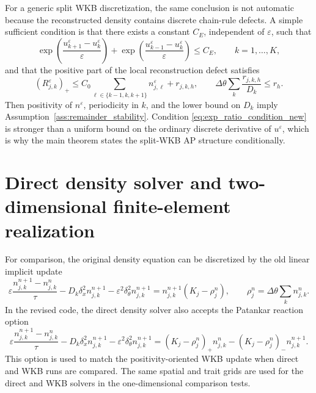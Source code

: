 \documentclass[11pt]{article}
\begin{document}
For a generic split WKB discretization, the same conclusion is not automatic because the reconstructed density contains discrete chain-rule defects.  A simple sufficient condition is that there exists a constant \(C_E\), independent of \(\varepsilon\), such that
\begin{equation}\label{eq:exp_ratio_condition_new}
    \exp\left(\frac{u_{k+1}^{\varepsilon}-u_k^{\varepsilon}}{\varepsilon}\right)
    +
    \exp\left(\frac{u_{k-1}^{\varepsilon}-u_k^{\varepsilon}}{\varepsilon}\right)
    \le C_E,
    \qquad k=1,\ldots,K,
\end{equation}
and that the positive part of the local reconstruction defect satisfies
\begin{equation}\label{eq:local_defect_condition_new}
    (R_{j,k}^{\varepsilon})_+
    \le C_0\sum_{\ell\in\{k-1,k,k+1\}}n_{j,\ell}^{\varepsilon}+r_{j,k,h},
    \qquad
    \Delta\theta\sum_k\frac{r_{j,k,h}}{D_k}\le r_h.
\end{equation}
Then positivity of \(n^\varepsilon\), periodicity in \(k\), and the lower bound on \(D_k\) imply Assumption~\ref{ass:remainder_stability}.  Condition \eqref{eq:exp_ratio_condition_new} is stronger than a uniform bound on the ordinary discrete derivative of \(u^\varepsilon\), which is why the main theorem states the split-WKB AP structure conditionally.

\section{Direct density solver and two-dimensional finite-element realization}\label{app:direct_2d}

For comparison, the original density equation can be discretized by the old linear implicit update
\begin{equation}\label{eq:direct_density_fully_new}
    \varepsilon\frac{n_{j,k}^{n+1}-n_{j,k}^n}{\tau}
    -D_k\delta_x^2n_{j,k}^{n+1}
    -\varepsilon^2\delta_\theta^2n_{j,k}^{n+1}
    =n_{j,k}^{n+1}(K_j-\rho_j^n),
    \qquad
    \rho_j^n=\Delta\theta\sum_k n_{j,k}^n.
\end{equation}
{\color{red} In the revised code, the direct density solver also accepts the Patankar reaction option
\begin{equation}\label{eq:direct_density_patankar_new}
    \varepsilon\frac{n_{j,k}^{n+1}-n_{j,k}^n}{\tau}
    -D_k\delta_x^2n_{j,k}^{n+1}
    -\varepsilon^2\delta_\theta^2n_{j,k}^{n+1}
    =(K_j-\rho_j^n)_+n_{j,k}^n-(K_j-\rho_j^n)_-n_{j,k}^{n+1}.
\end{equation}
This option is used to match the positivity-oriented WKB update when direct and WKB runs are compared.} The same spatial and trait grids are used for the direct and WKB solvers in the one-dimensional comparison tests.
\end{document}

